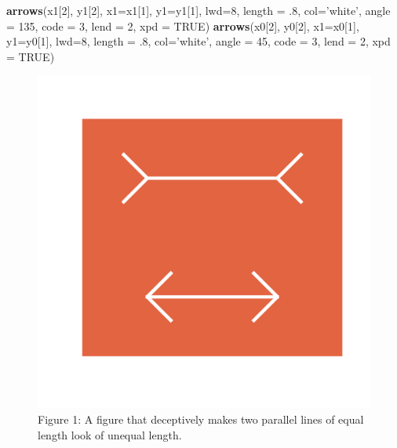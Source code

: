 \documentclass[]{article}
\newenvironment{Shaded}{\begin{snugshade}}{\end{snugshade}}
\newcommand{\KeywordTok}[1]{\textcolor[rgb]{0.13,0.29,0.53}{\textbf{#1}}}
\newcommand{\DataTypeTok}[1]{\textcolor[rgb]{0.13,0.29,0.53}{#1}}
\newcommand{\DecValTok}[1]{\textcolor[rgb]{0.00,0.00,0.81}{#1}}
\newcommand{\StringTok}[1]{\textcolor[rgb]{0.31,0.60,0.02}{#1}}
\newcommand{\OtherTok}[1]{\textcolor[rgb]{0.56,0.35,0.01}{#1}}
\newcommand{\NormalTok}[1]{#1}
\begin{document}
\begin{Shaded}
\begin{Highlighting}[]
\KeywordTok{arrows}\NormalTok{(x1[}\DecValTok{2}\NormalTok{], y1[}\DecValTok{2}\NormalTok{], }\DataTypeTok{x1=}\NormalTok{x1[}\DecValTok{1}\NormalTok{], }\DataTypeTok{y1=}\NormalTok{y1[}\DecValTok{1}\NormalTok{], }\DataTypeTok{lwd=}\DecValTok{8}\NormalTok{, }\DataTypeTok{length =}\NormalTok{ .}\DecValTok{8}\NormalTok{, }\DataTypeTok{col=}\StringTok{'white'}\NormalTok{, }\DataTypeTok{angle =} \DecValTok{135}\NormalTok{, }\DataTypeTok{code =} \DecValTok{3}\NormalTok{, }\DataTypeTok{lend =} \DecValTok{2}\NormalTok{, }\DataTypeTok{xpd =} \OtherTok{TRUE}\NormalTok{)}
\KeywordTok{arrows}\NormalTok{(x0[}\DecValTok{2}\NormalTok{], y0[}\DecValTok{2}\NormalTok{], }\DataTypeTok{x1=}\NormalTok{x0[}\DecValTok{1}\NormalTok{], }\DataTypeTok{y1=}\NormalTok{y0[}\DecValTok{1}\NormalTok{], }\DataTypeTok{lwd=}\DecValTok{8}\NormalTok{, }\DataTypeTok{length =}\NormalTok{ .}\DecValTok{8}\NormalTok{, }\DataTypeTok{col=}\StringTok{'white'}\NormalTok{, }\DataTypeTok{angle =} \DecValTok{45}\NormalTok{, }\DataTypeTok{code =} \DecValTok{3}\NormalTok{, }\DataTypeTok{lend =} \DecValTok{2}\NormalTok{, }\DataTypeTok{xpd =} \OtherTok{TRUE}\NormalTok{)}
\end{Highlighting}
\end{Shaded}

\begin{figure}
\centering
\includegraphics{Assignment3_files/figure-latex/unnamed-chunk-1-1.pdf}
\caption{Figure 1: A figure that deceptively makes two parallel lines of
equal length look of unequal length.}
\end{figure}
\end{document}
